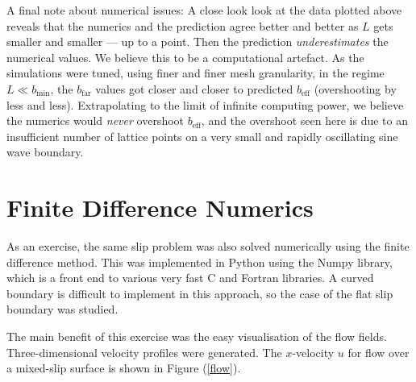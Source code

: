 \documentclass[12pt, a4paper, twoside, openright]{book}
\newcommand{\beff}{\ensuremath{b_{\mathrm{eff}}}}
\newcommand{\bmin}{\ensuremath{b_{\mathrm{min}}}}
\newcommand{\bfar}{\ensuremath{b_{\mathrm{far}}}}
\begin{document}
\vspace{2em}

A final note about numerical issues:  A close look look at the data plotted above reveals that the numerics and the prediction agree better and better as $L$ gets smaller and smaller --- up to a point.  Then the prediction \emph{underestimates} the numerical values.  We believe this to be a computational artefact.  As the simulations were tuned, using finer and finer mesh granularity, in the regime $L \ll \bmin$, the $\bfar$ values got closer and closer to predicted $\beff$ (overshooting by less and less).  Extrapolating to the limit of infinite computing power, we believe the numerics would \emph{never} overshoot $\beff$, and the overshoot seen here is due to an insufficient number of lattice points on a very small and rapidly oscillating sine wave boundary.


\clearpage
\section{Finite Difference Numerics}

As an exercise, the same slip problem was also solved numerically using the finite difference method.  This was implemented in Python using the Numpy library, which is a front end to various very fast C and Fortran libraries.  A curved boundary is difficult to implement in this approach, so the case of the flat slip boundary was studied.

The main benefit of this exercise was the easy visualisation of the flow fields. Three-dimensional velocity profiles were generated.  The $x$-velocity $u$ for flow over a mixed-slip surface is shown in Figure (\ref{flow}).
\end{document}
